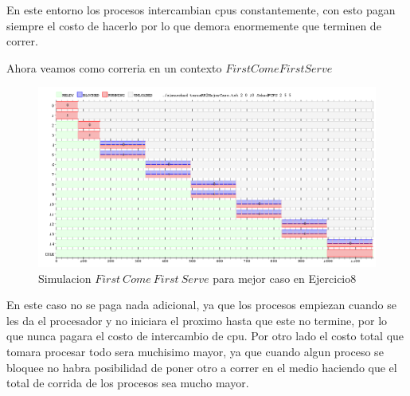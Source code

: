 \documentclass[11pt]{article}
\begin{document}
En este entorno los procesos intercambian cpus constantemente, con esto pagan siempre el costo de hacerlo por lo que demora enormemente que terminen de correr.

Ahora veamos como correria en un contexto $FirstComeFirstServe$


  \begin{figure}[H]
    \includegraphics[scale=0.5]{Ej8MejorCasoFCFS}
    \caption{Simulacion $First\ Come\ First\ Serve$ para mejor caso en Ejercicio8}
  \end{figure}

En este caso no se paga nada adicional, ya que los procesos empiezan cuando se les da el procesador y no iniciara el proximo hasta que este no termine, por lo que nunca pagara el costo de intercambio de cpu. Por otro lado el costo total que tomara procesar todo sera muchisimo mayor, ya que cuando algun proceso se bloquee no habra posibilidad de poner otro a correr en el medio haciendo que el total de corrida de los procesos sea mucho mayor.
\end{document}
